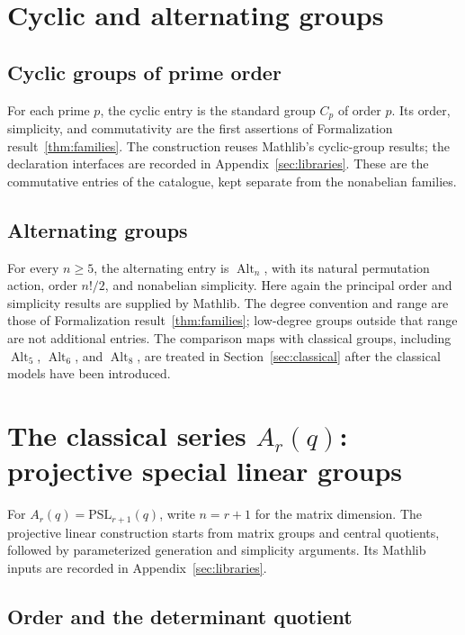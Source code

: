 \documentclass[11pt]{article}
\numberwithin{equation}{section}
\theoremstyle{definition}
\newcommand{\PSL}{\mathrm{PSL}}
\newcommand{\Alt}{\operatorname{Alt}}
\begin{document}

\section{Cyclic and alternating groups}\label{sec:elementary}

\subsection{Cyclic groups of prime order}

For each prime $p$, the cyclic entry is the standard group $C_p$ of
order $p$. Its order, simplicity, and commutativity are the first
assertions of Formalization result~\ref{thm:families}. The construction
reuses Mathlib's cyclic-group results; the declaration interfaces are
recorded in Appendix~\ref{sec:libraries}. These are the commutative
entries of the catalogue, kept separate from the nonabelian families.

\subsection{Alternating groups}

For every $n\geq5$, the alternating entry is $\Alt_n$, with its natural
permutation action, order $n!/2$, and nonabelian simplicity. Here again
the principal order and simplicity results are supplied by Mathlib.
The degree convention and range are those of Formalization
result~\ref{thm:families}; low-degree groups outside that range are
not additional entries. The comparison maps with classical groups,
including $\Alt_5$, $\Alt_6$, and $\Alt_8$, are treated in
Section~\ref{sec:classical} after the classical models have been
introduced.

\section{The classical series \texorpdfstring{$A_r(q)$}{Ar(q)}: projective special linear groups}
\label{sec:psl}

For $A_r(q)=\PSL_{r+1}(q)$, write $n=r+1$ for the matrix dimension.
The projective linear construction starts from matrix groups and
central quotients, followed by parameterized generation and
simplicity arguments. Its Mathlib inputs are recorded in
Appendix~\ref{sec:libraries}.

\subsection{Order and the determinant quotient}
\end{document}
